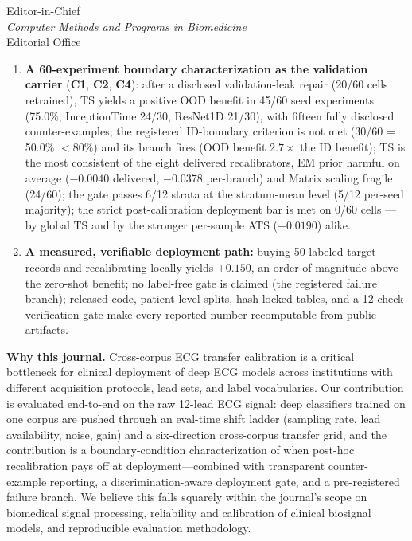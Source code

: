 \documentclass[11pt,letterpaper]{letter}
\begin{document}
\begin{letter}{Editor-in-Chief\\
\emph{Computer Methods and Programs in Biomedicine}\\
Editorial Office}
\begin{enumerate}
three-component Shapley decomposition of the transfer benefit
(\textbf{C3}; 27/27 cells at the pre-registered $n=20{,}000$ readout),
a two-layer deployment-safety gate S1/S2 (\textbf{C5}; S1: positive
calibration benefit, S2: OOD accuracy at or above the target
majority-class baseline), and a pre-registered applicability-boundary
protocol (amendments A1--A4) that fixes what may be claimed before
unblinding.
\item \textbf{A 60-experiment boundary characterization as the
validation carrier} (\textbf{C1}, \textbf{C2}, \textbf{C4}): after a
disclosed validation-leak repair (20/60 cells retrained), TS yields a
positive OOD benefit in 45/60 seed experiments (75.0\%; InceptionTime
24/30, ResNet1D 21/30), with fifteen fully disclosed counter-examples;
the registered ID-boundary criterion is not met (30/60 = 50.0\% $<\!80\%$)
and its branch fires (OOD benefit $2.7\times$ the ID benefit); TS is
the most consistent of the eight delivered recalibrators, EM prior
harmful on average ($-0.0040$ delivered, $-0.0378$ per-branch) and
Matrix scaling fragile (24/60); the gate passes 6/12 strata at the
stratum-mean level (5/12 per-seed majority); the strict
post-calibration deployment bar is met on 0/60 cells --- by global TS
and by the stronger per-sample ATS ($+0.0190$) alike.
\item \textbf{A measured, verifiable deployment path:} buying 50
labeled target records and recalibrating locally yields $+0.150$, an
order of magnitude above the zero-shot benefit; no label-free gate is
claimed (the registered failure branch); released code, patient-level
splits, hash-locked tables, and a 12-check verification gate make
every reported number recomputable from public artifacts.
\end{enumerate}

\bigskip

\textbf{Why this journal.}
Cross-corpus ECG transfer calibration is a critical bottleneck for
clinical deployment of deep ECG models across institutions with
different acquisition protocols, lead sets, and label vocabularies.
Our contribution is evaluated end-to-end on the raw 12-lead ECG
signal: deep classifiers trained on one corpus are pushed through an
eval-time shift ladder (sampling rate, lead availability, noise, gain)
and a six-direction cross-corpus transfer grid, and the contribution is
a boundary-condition characterization of when post-hoc recalibration
pays off at deployment---combined with transparent counter-example
reporting, a discrimination-aware deployment gate, and a
pre-registered failure branch. We believe this falls squarely within
the journal's scope on biomedical signal processing, reliability and
calibration of clinical biosignal models, and reproducible evaluation
methodology.


\end{letter}
\end{document}
